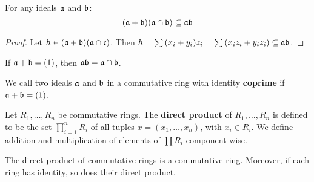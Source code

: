 \begin{theorem}\label{theorem_5.5.8}
  For any ideals $\af$ and $\bf$:
  \begin{equation}
    (\af+\bf)(\af \cap \bf) \subseteq \af\bf
  \end{equation}
\end{theorem}
\begin{proof}
  Let $h \in (\af+\bf)(\af \cap \cf)$. Then $h=\sum{(x_i+y_i)z_i}=
  \sum{(x_iz_i+y_iz_i)} \subseteq \af\bf$.
\end{proof}
\begin{corollary}
  If $\af+\bf=(1)$, then $\af\bf=\af \cap \bf$.
\end{corollary}

\begin{definition}
  We call two ideals $\af$ and $\bf$ in a commutative ring with
  identity \textbf{coprime} if $\af+\bf=(1)$.
\end{definition}

\begin{definition}
  Let $R_1, \dots, R_n$ be commutative rings. The \textbf{direct product} of
  $R_1, \dots, R_n$ is defined to be the set $\prod_{i=1}^n{R_i}$ of all tuples
  $x=(x_1, \dots, x_n)$, with $x_i \in R_i$. We define addition and
  multiplication of elements of $\prod{R_i}$ component-wise.
\end{definition}

\begin{lemma}\label{lemma_5.5.9}
  The direct product of commutative rings is a commutative ring. Moreover, if
  each ring has identity, so does their direct product.
\end{lemma}

